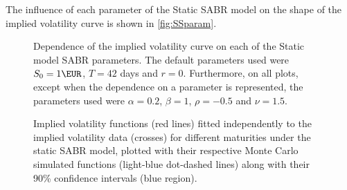 The influence of each parameter of the Static SABR model on the shape of the implied volatility curve is shown in \autoref{fig:SSparam}.

\begin{figure}[H]
  \begin{subfigmatrix}{2}
  \end{subfigmatrix}
  \caption[Dependence of the implied volatility curve on each of the Static SABR model parameters.]{Dependence of the implied volatility curve on each of the Static model SABR parameters. The default parameters used were $S_0=1\EUR$, $T=42$ days and $r=0$. Furthermore, on all plots, except when the dependence on a parameter is represented, the parameters used were $\alpha=0.2$, $\beta=1$, $\rho=-0.5$ and $\nu=1.5$.}
  \label{fig:SSparam}
\end{figure}


\begin{figure}[H]
  \begin{subfigmatrix}{2}
  \end{subfigmatrix}
  \caption[Implied volatility functions fitted independently to the implied volatility data for different maturities under the static SABR model, plotted with their respective Monte Carlo simulated functions along with their 90\% confidence intervals.]{Implied volatility functions (red lines) fitted independently to the implied volatility data (crosses) for different maturities under the static SABR model, plotted with their respective Monte Carlo simulated functions (light-blue dot-dashed lines) along with their 90\% confidence intervals (blue region).}
  \label{fig:SS}
\end{figure}


